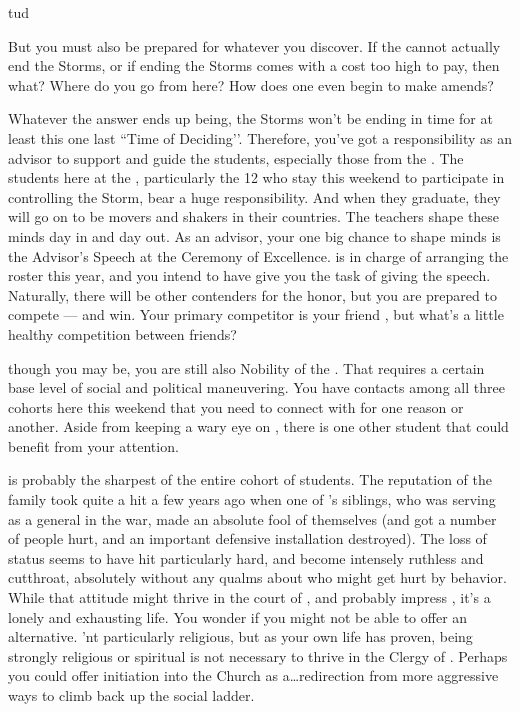 tud\documentclass[char]{GL2020}
\begin{document}
 But you must also be prepared for whatever you discover. If the \pTech{} cannot actually end the Storms, or if ending the Storms comes with a cost too high to pay, then what? Where do you go from here? How does one even begin to make amends?

Whatever the answer ends up being, the Storms won't be ending in time for at least this one last ``Time of Deciding’’. Therefore, you've got a responsibility as an advisor to support and guide the students, especially those from the \pFarm{}. The students here at the \pSc{}, particularly the 12 who stay this weekend to participate in controlling the Storm, bear a huge responsibility. And when they graduate, they will go on to be movers and shakers in their countries. The teachers shape these minds day in and day out. As an advisor, your one big chance to shape minds is the Advisor's Speech at the Ceremony of Excellence. \cMusic{} is in charge of arranging the roster this year, and you intend to have \cMusic{\them} give you the task of giving the speech. Naturally, there will be other contenders for the honor, but you are prepared to compete — and win. Your primary competitor is your friend \cCurse{}, but what's a little healthy competition between friends?

\cHedonist{\Cleric} though you may be, you are still also Nobility of the \pFarm{}. That requires a certain base level of social and political maneuvering. You have contacts among all three cohorts here this weekend that you need to connect with for one reason or another. Aside from keeping a wary eye on \cDisney{}, there is one other student that could benefit from your attention.

\cLibAssist{} is probably the sharpest of the entire cohort of students. The reputation of the \cLibAssist{\formal} family took quite a hit a few years ago when one of \cLibAssist{}’s siblings, who was serving as a general in the war, made an absolute fool of themselves (and got a number of people hurt, and an important defensive installation destroyed). The loss of status seems to have hit \cLibAssist{} particularly hard, and \cLibAssist{\they} \cLibAssist{\have} become intensely ruthless and cutthroat, absolutely without any qualms about who might get hurt by \cLibAssist{\their} behavior. While that attitude might thrive in the court of \cQueen{\full}, and probably impress \cPrince{}, it’s a lonely and exhausting life. You wonder if you might not be able to offer \cLibAssist{} an alternative. \cLibAssist{\They} \cLibAssist{\are}’nt particularly religious, but as your own life has proven, being strongly religious or spiritual is not necessary to thrive in the Clergy of \cFarmGod{}. Perhaps you could offer initiation into the Church as a\ldots redirection from more aggressive ways to climb back up the social ladder.
\end{document}

